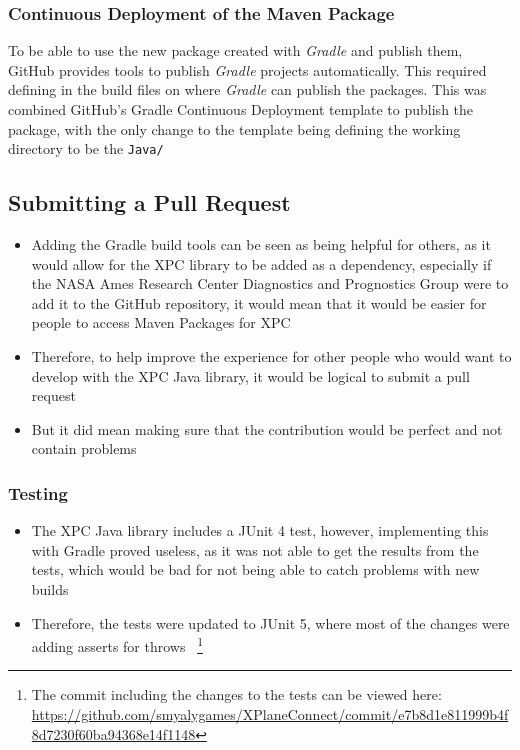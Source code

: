 \documentclass[../dissertation.tex]{subfiles}
\begin{document}
\subsubsection{Continuous Deployment of the Maven Package}

To be able to use the new package created with \textit{Gradle} and publish them,
GitHub provides tools to publish \textit{Gradle} projects automatically.
This required defining in the build files on where \textit{Gradle} can
publish the packages.
This was combined GitHub's Gradle Continuous Deployment template
to publish the package, with the only change to the template being defining the working
directory to be the \lstinline|Java/|


\subsection{Submitting a Pull Request}
\begin{itemize}
  \item Adding the Gradle build tools can be seen as being helpful
    for others, as it would allow for the XPC library to be added
    as a dependency, especially if the NASA Ames Research Center Diagnostics and Prognostics Group
    were to add it to the GitHub repository, it would mean that it would be easier for
    people to access Maven Packages for XPC
  \item Therefore, to help improve the experience for other people who would want
    to develop with the XPC Java library, it would be logical to submit a
    pull request
  \item But it did mean making sure that the contribution would be perfect and not contain problems %
\end{itemize}

\subsubsection{Testing}
\begin{itemize}
  \item The XPC Java library includes a JUnit 4 test, however, implementing this
    with Gradle proved useless, as it was not able to get the results from the
    tests, which would be bad for not being able to catch problems with new builds
  \item Therefore, the tests were updated to JUnit 5, where most of the changes were
    adding asserts for throws~\cite{junit:migrate}
    \footnote{The commit including the changes to the tests can be viewed here:
    \url{https://github.com/smyalygames/XPlaneConnect/commit/e7b8d1e811999b4f8d7230f60ba94368e14f1148}}
\end{itemize}
\end{document}
